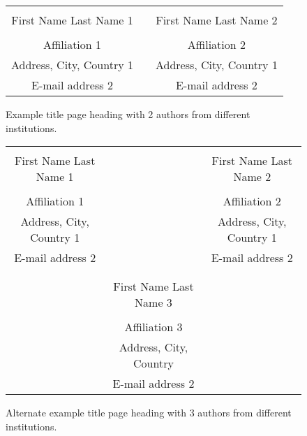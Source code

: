 \documentclass{scspaperproc}
\theoremstyle{scsthe}
\begin{document}
\begin{figure*}[htb]
{
\centering
\begin{tabular}{ccc}
\phantom{Entries to adjust spacing - ignore} & \phantom{intermediate space} & \phantom{Entries to adjust spacing - ignore} \\
First Name Last Name 1 & & First Name Last Name 2 \\
\\
Affiliation 1 & & Affiliation 2 \\
Address, City, Country 1 & & Address, City, Country 1 \\
E-mail address 2 & & E-mail address 2 
\end{tabular}
\caption{Example title page heading with 2 authors from different institutions.\label{fig2different}}
}
\end{figure*}

\begin{figure*}[htb]
{
\centering
\begin{tabular}{ccc}
\phantom{This adjusts spacing - ignore} & \phantom{This adjusts spacing - ignore} & \phantom{This adjusts spacing - ignore} \\
First Name Last Name 1 & & First Name Last Name 2 \\
\\
Affiliation 1 & & Affiliation 2 \\
Address, City, Country 1 & & Address, City, Country 1 \\
E-mail address 2 & & E-mail address 2 \\
\\
\\
& First Name Last Name 3 \\
\\
& Affiliation 3\\
& Address, City, Country \\
& E-mail address 2 
\end{tabular}
\caption{Alternate example title page heading with 3 authors from different institutions. \label{fig3different}}
}
\end{figure*}
\end{document}
